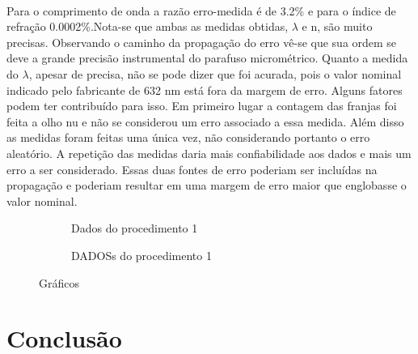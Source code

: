 \documentclass[a4paper,11pt]{article}
\begin{document}
\paragraph{}Para o comprimento de onda a razão erro-medida é de 3.2\% e para o índice de refração 0.0002\%.Nota-se que ambas as medidas obtidas, $\lambda$ e n, são muito precisas. Observando o caminho da propagação do erro vê-se que sua ordem se deve a grande precisão instrumental do parafuso micrométrico. Quanto a medida do $\lambda$, apesar de precisa, não se pode dizer que foi acurada, pois o valor nominal indicado pelo fabricante de 632 nm está fora da margem de erro. Alguns fatores podem ter contribuído para isso. Em primeiro lugar a contagem das franjas foi feita a olho nu e não se considerou um erro associado a essa medida. Além disso as medidas foram feitas uma única vez, não considerando portanto o erro aleatório. A repetição das medidas daria mais confiabilidade aos dados e mais um erro a ser considerado. Essas duas fontes de erro poderiam ser incluídas na propagação e poderiam resultar em uma margem de erro maior que englobasse o valor nominal.

\FloatBarrier
  

\begin{figure}

    \begin{subfigure}[!htp]{0.3\textwidth}
        
        \caption{Dados do procedimento 1}
        \label{graph-1}  
    \end{subfigure}

    \begin{subfigure}[!htp]{0.3\textwidth}
        
        \caption{DADOSs do procedimento 1}
        \label{graph-2}  
    \end{subfigure}
    
    \caption{Gráficos}
    
\end{figure}


\FloatBarrier


\section{Conclusão}
\end{document}
